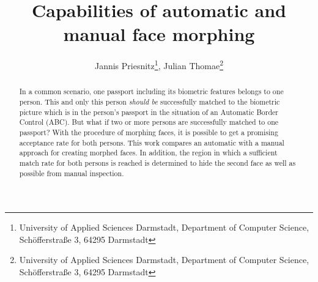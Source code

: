 \documentclass[english]{lni}
\author{Jannis Priesnitz\footnote{University of Applied Sciences Darmstadt, Department of Computer Science, Schöfferstraße 3, 64295 Darmstadt \email{jannis.priesnitz@stud.h-da.de}}, Julian Thomae\footnote{University of Applied Sciences Darmstadt, Department of Computer Science, Schöfferstraße 3, 64295 Darmstadt \email{jueliant@gmail.com}}}
\title[Capabilities of face morphing]{Capabilities of automatic and manual face morphing}
\renewcommand{\headrulewidth}{0.4pt} %
\begin{document}
	
	\maketitle
	
	\renewcommand{\refname}{References}
	\setcounter{footnote}{2} %
	
	\pagestyle{fancy}
	\fancyhead{} 
	\fancyfoot{} 
	\renewcommand{\headrulewidth}{0.4pt} 
	\begin{abstract}
		In a common scenario, one passport including its biometric features belongs to one person. This and only this person \textit{should be} successfully matched to the biometric picture which is in the person's passport in the situation of an Automatic Border Control (ABC). But what if two or more persons are successfully matched to one passport? With the procedure of morphing faces, it is possible to get a promising acceptance rate for both persons. This work compares an automatic with a manual approach for creating morphed faces. In addition, the region in which a sufficient match rate for both persons is reached is determined to hide the second face as well as possible from manual inspection. 
		
	\end{abstract}
	
	\pagestyle{fancy}
	\fancyhead{} 
	\fancyfoot{} 
	\renewcommand{\headrulewidth}{0.4pt}
	
		
		
		
		
		
		
		
	
	
	
\end{document}
